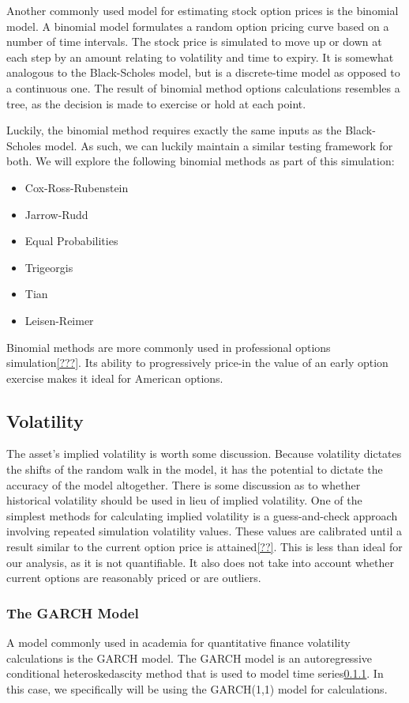 Another commonly used model for estimating stock option prices is the binomial model. A binomial model formulates a random option pricing curve based on a number of time intervals. The stock price is simulated to move up or down at each step by an amount relating to volatility and time to expiry. It is somewhat analogous to the Black-Scholes model, but is a discrete-time model as opposed to a continuous one. The result of binomial method options calculations resembles a tree, as the decision is made to exercise or hold at each point.

Luckily, the binomial method requires exactly the same inputs as the Black-Scholes model. As such, we can luckily maintain a similar testing framework for both. We will explore the following binomial methods as part of this simulation:

\begin{itemize}
\item{Cox-Ross-Rubenstein}
\item{Jarrow-Rudd}
\item{Equal Probabilities}
\item{Trigeorgis}
\item{Tian}
\item{Leisen-Reimer}
\end{itemize}

Binomial methods are more commonly used in professional options simulation\ref{???}. Its ability to progressively price-in the value of an early option exercise makes it ideal for American options. 

\subsection{Volatility}
The asset's implied volatility is worth some discussion. Because volatility dictates the shifts of the random walk in the model, it has the potential to dictate the accuracy of the model altogether. There is some discussion as to whether historical volatility should be used in lieu of implied volatility. One of the simplest methods for calculating implied volatility is a guess-and-check approach involving repeated simulation volatility values. These values are calibrated until a result similar to the current option price is attained\ref{??}. This is less than ideal for our analysis, as it is not quantifiable. It also does not take into account whether current options are reasonably priced or are outliers.
\subsubsection{The GARCH Model}
A model commonly used in academia for quantitative finance volatility calculations is the GARCH model. The GARCH model is an autoregressive conditional heteroskedascity method that is used to model time series\ref{}. In this case, we specifically will be using the GARCH(1,1) model for calculations. 

